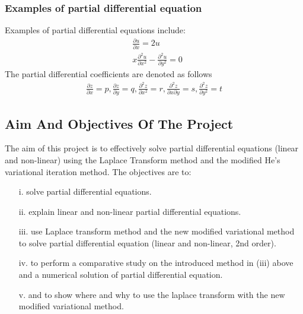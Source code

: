 \documentclass[12pt]{report}
\begin{document}
\subsection {Examples of partial differential equation}
Examples of partial differential equations include:
\begin{align*}
& \frac{\partial u}{\partial x}=2u \\
& x \frac{\partial^2u}{\partial x^2}-\frac{\partial^2u}{\partial y^2}=0
\end{align*}
The partial differential coefficients are denoted as follows
\begin{align*}
 \frac{\partial z}{\partial x}=p, \frac{\partial z}{\partial y}=q, \frac{\partial^2z}{\partial x^2}=r,
\frac{\partial^2z}{\partial x \partial y}=s, \frac{\partial^2z}{\partial y^2}=t
\end{align*}
\section{Aim And Objectives Of The Project}
\qquad The aim of this project is to effectively solve partial differential equations (linear and non-linear) using the Laplace Transform method and the modified He's variational iteration method. The objectives are to:
\begin{enumerate}
	\item[i.] solve partial differential equations.
  \item[ii.] explain linear and non-linear partial differential equations.
  \item[iii.] use Laplace transform method and the new modified variational method to solve partial differential equation (linear and non-linear, 2nd order).
	\item[iv.] to perform a comparative study on the introduced method  in (iii) above and a numerical solution of partial differential equation.
	\item[v.] and to show where and why to use the laplace transform with the new modified variational method.
\end{enumerate}
\chapter{}
\end{document}
